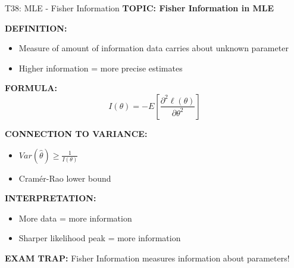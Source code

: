 \documentclass[8pt]{beamer}
\begin{document}
	\begin{frame}{T38: MLE - Fisher Information}
		\fontsize{6.5}{7.5}\selectfont
		\textbf{TOPIC: Fisher Information in MLE}
		
		\vspace{0.1cm}
		\textbf{DEFINITION:}
		\begin{itemize}
			\item Measure of amount of information data carries about unknown parameter
			\item Higher information = more precise estimates
		\end{itemize}
		
		\vspace{0.1cm}
		\textbf{FORMULA:}
		\[
		I(\theta) = -E\left[\frac{\partial^2 \ell(\theta)}{\partial \theta^2}\right]
		\]
		
		\vspace{0.1cm}
		\textbf{CONNECTION TO VARIANCE:}
		\begin{itemize}
			\item $Var(\hat{\theta}) \geq \frac{1}{I(\theta)}$
			\item Cramér-Rao lower bound
		\end{itemize}
		
		\vspace{0.1cm}
		\textbf{INTERPRETATION:}
		\begin{itemize}
			\item More data = more information
			\item Sharper likelihood peak = more information
		\end{itemize}
		
		\textcolor{myred}{\textbf{EXAM TRAP:}} Fisher Information measures \textcolor{myblue}{information about parameters}!
	\end{frame}
	
\end{document}
